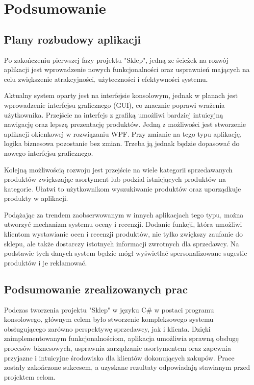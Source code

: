 ﻿\chapter{Podsumowanie}
\section{Plany rozbudowy aplikacji}

Po zakończeniu pierwszej fazy projektu "Sklep", jedną ze ścieżek na rozwój aplikacji jest wprowadzenie nowych funkcjonalności oraz usprawnień mających na celu zwiększenie atrakcyjności, użyteczności i efektywności systemu.\newline

Aktualny system oparty jest na interfejsie konsolowym, jednak w planach jest wprowadzenie interfejsu graficznego (GUI), co znacznie poprawi wrażenia użytkownika. Przejście na interfejs z grafiką umożliwi bardziej intuicyjną nawigację oraz lepszą prezentację produktów. Jedną z możliwości jest stworzenie aplikacji okienkowej w rozwiązaniu WPF. Przy zmianie na tego typu aplikację, logika biznesowa pozostanie bez zmian. Trzeba ją jednak będzie dopasować do nowego interfejsu graficznego.\newline

Kolejną możliwością rozwoju jest przejście na wiele kategorii sprzedawanych produktów zwiększając asortyment lub podzial istniejących produktów na kategorie. Ułatwi to użytkownikom wyszukiwanie produktów oraz uporządkuje produkty w aplikacji.\newline

Podążając za trendem zaobserwowanym w innych aplikacjach tego typu, można utworzyć mechanizm systemu oceny i recenzji. Dodanie funkcji, która umożliwi klientom wystawianie ocen i recenzji produktów, nie tylko zwiększy zaufanie do sklepu, ale także dostarczy istotnych informacji zwrotnych dla sprzedawcy. Na podstawie tych danych system będzie mógł wyświetlać spersonalizowane sugestie produktów i je reklamować.

\section{Podsumowanie zrealizowanych prac}

Podczas tworzenia projektu "Sklep" w języku C\# w postaci programu konsolowego, głównym celem było stworzenie kompleksowego systemu obsługującego zarówno perspektywę sprzedawcy, jak i klienta. Dzięki zaimplementowanym funkcjonalnościom, aplikacja umożliwia sprawną obsługę procesów biznesowych, usprawnia zarządzanie asortymentem oraz zapewnia przyjazne i intuicyjne środowisko dla klientów dokonujących zakupów. Prace zostały zakończone sukcesem, a uzyskane rezultaty odpowiadają stawianym przed projektem celom.


